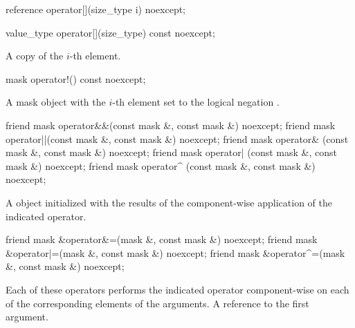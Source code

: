 \begin{itemdecl}
reference operator[](size_type i) noexcept;
\end{itemdecl}
\begin{itemdescr}
  \dataparElementReference{\mask}
\end{itemdescr}

\begin{itemdecl}
value_type operator[](size_type) const noexcept;
\end{itemdecl}
\begin{itemdescr}
  \pnum\returns A copy of the $i$-th element.
\end{itemdescr}

\begin{itemdecl}
mask operator!() const noexcept;
\end{itemdecl}
\begin{itemdescr}
  \pnum\returns A mask object with the $i$-th element set to the logical negation \foralli.
\end{itemdescr}


\begin{itemdecl}
friend mask operator&&(const mask &, const mask &) noexcept;
friend mask operator||(const mask &, const mask &) noexcept;
friend mask operator& (const mask &, const mask &) noexcept;
friend mask operator| (const mask &, const mask &) noexcept;
friend mask operator^ (const mask &, const mask &) noexcept;
\end{itemdecl}
\begin{itemdescr}
  \pnum\returns A \mask object initialized with the results of the component-wise application of the indicated operator.
\end{itemdescr}

\begin{itemdecl}
friend mask &operator&=(mask &, const mask &) noexcept;
friend mask &operator|=(mask &, const mask &) noexcept;
friend mask &operator^=(mask &, const mask &) noexcept;
\end{itemdecl}
\begin{itemdescr}
  \pnum\effects Each of these operators performs the indicated operator component-wise on each of the corresponding elements of the arguments.
  \pnum\returns A reference to the first argument.
\end{itemdescr}

